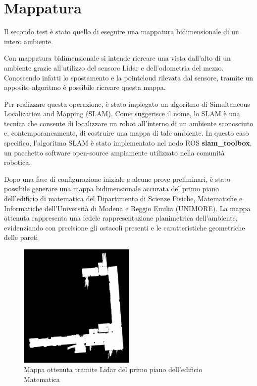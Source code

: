 \section{Mappatura}
Il secondo test è stato quello di eseguire una mappatura bidimensionale di un intero ambiente.

\noindent Con mappatura bidimensionale si intende ricreare una vista dall'alto di un ambiente grazie all'utilizzo del sensore Lidar e dell'odometria del mezzo. Conoscendo infatti lo spostamento e la pointcloud rilevata dal sensore, tramite un apposito algoritmo è possibile ricreare questa mappa.

\noindent Per realizzare questa operazione, è stato impiegato un algoritmo di Simultaneous Localization and Mapping (SLAM). Come suggerisce il nome, lo SLAM è una tecnica che consente di localizzare un robot all'interno di un ambiente sconosciuto e, contemporaneamente, di costruire una mappa di tale ambiente. In questo caso specifico, l'algoritmo SLAM è stato implementato nel nodo ROS \textbf{slam\_toolbox}, un pacchetto software open-source ampiamente utilizzato nella comunità robotica.

\noindent Dopo una fase di configurazione iniziale e alcune prove preliminari, è stato possibile generare una mappa bidimensionale accurata del primo piano dell'edificio di matematica del Dipartimento di Scienze Fisiche, Matematiche e Informatiche dell'Università di Modena e Reggio Emilia (UNIMORE). La mappa ottenuta rappresenta una fedele rappresentazione planimetrica dell'ambiente, evidenziando con precisione gli ostacoli presenti e le caratteristiche geometriche delle pareti

\begin{figure}[H]
  \centering
  \includegraphics[width=0.5\textwidth]{figures/franco_map.png}
  \caption{Mappa ottenuta tramite Lidar del primo piano dell'edificio Matematica}
  \label{franco_map}
\end{figure}


